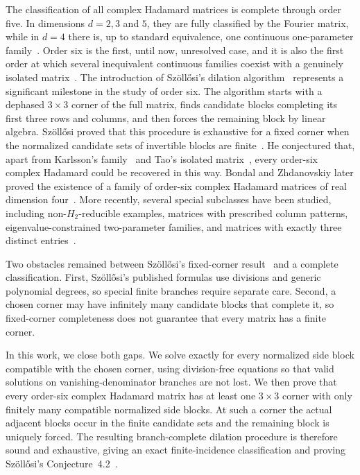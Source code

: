 The classification of all complex Hadamard matrices is complete through order five. In dimensions $d=2,3$ and $5$, they are fully classified by the Fourier matrix, while in $d=4$ there is, up to standard equivalence, one continuous one-parameter family~\cite{Haagerup1997,TadejZyczkowski2006}.
Order six is the first, until now, unresolved case, and it is also the first order at which several inequivalent continuous families coexist with a genuinely isolated matrix~\cite{TadejZyczkowski2006,Szollosi2012FourParameter,BengtssonEtAl2007,Tadej2008}. The introduction of Sz\"oll\H{o}si's dilation algorithm~\cite{Szollosi2012FourParameter} represents a significant milestone in the study of order six. The algorithm starts with a dephased $3\times3$ corner of the full matrix, finds candidate blocks completing its first three rows and columns, and then forces the remaining block by linear algebra. Sz\"oll\H{o}si proved that this procedure is exhaustive for a fixed corner when the normalized candidate sets of invertible blocks are finite~\cite{Szollosi2012FourParameter}. He conjectured that, apart from Karlsson's family~\cite{Karlsson2011H2,Karlsson2011ThreeParameter} and Tao's isolated 
matrix~\cite{Tao2004,BengtssonEtAl2007,Tadej2008}, every order-six complex Hadamard could be recovered in this way. 
Bondal and Zhdanovskiy later proved the existence of a family of order-six complex Hadamard matrices of real dimension four~\cite{BondalZhdanovskiy2016}. More recently, several special subclasses have been studied, including non-$H_2$-reducible examples, matrices with prescribed column patterns, eigenvalue-constrained two-parameter families, and matrices with exactly three distinct entries~\cite{LiangEtAl2024,MatszangoszSzollosi2024,HuangChen2026Eigenvalues,HuangLiangChen2026ThreeElements}.
%


Two obstacles remained between Sz\"oll\H{o}si's fixed-corner result~\cite{Szollosi2012FourParameter} and a complete classification.
First, Sz\"oll\H{o}si's published formulas use divisions and generic polynomial degrees, so special finite branches require separate care.
Second, a chosen corner may have infinitely many candidate blocks that complete it, so fixed-corner completeness does not guarantee that every matrix has a finite corner.

In this work, we close both gaps. We solve exactly for every normalized side block compatible with the chosen corner, using division-free equations so that valid solutions on vanishing-denominator branches are not lost. We then prove that every order-six complex Hadamard matrix has at least one $3\times3$ corner with only finitely many compatible normalized side blocks. At such a corner the actual adjacent blocks occur in the finite candidate sets and the remaining block is uniquely forced. The resulting branch-complete dilation procedure is therefore sound and exhaustive, giving an exact finite-incidence classification and proving Sz\"oll\H{o}si's Conjecture~4.2~\cite{Szollosi2012FourParameter}.

